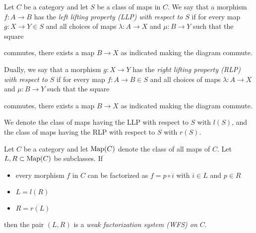 \begin{definition}
    Let $C$ be a category and let $S$ be a class of maps in $C$.
    We say that a morphism $f\colon A\to B$ has the \emph{left lifting property (LLP) with respect to $S$} if for every map $g\colon X\to Y\in S$ and all choices of maps $\lambda\colon A\to X$ and $\mu\colon B\to Y$ such that the square
    \begin{center}
    \end{center}
    commutes, there exists a map $B\to X$ as indicated making the diagram commute.

    Dually, we say that a morphism $g\colon X\to Y$ has the \emph{right lifting property (RLP) with respect to $S$} if for every map $f\colon A\to B\in S$ and all choices of maps $\lambda\colon A\to X$ and $\mu\colon B\to Y$ such that the square
    \begin{center}
    \end{center}
    commutes, there exists a map $B\to X$ as indicated making the diagram commute.

    We denote the class of maps having the LLP with respect to $S$ with $l(S)$, and the class of maps having the RLP with respect to $S$ with $r(S)$.
\end{definition}
\begin{definition}
    Let $C$ be a category and let $\operatorname{Map}(C)$ denote the class of all maps of $C$.
    Let $L,R\subset\operatorname{Map}(C)$ be subclasses.
    If 
    \begin{itemize}
        \item every morphism $f$ in $C$ can be factorized as $f=p\circ i$ with $i\in L$ and $p\in R$
        \item $L=l(R)$
        \item $R=r(L)$
    \end{itemize}
    then the pair $(L,R)$ is a \emph{weak factorization system (WFS) on $C$}.
\end{definition}
